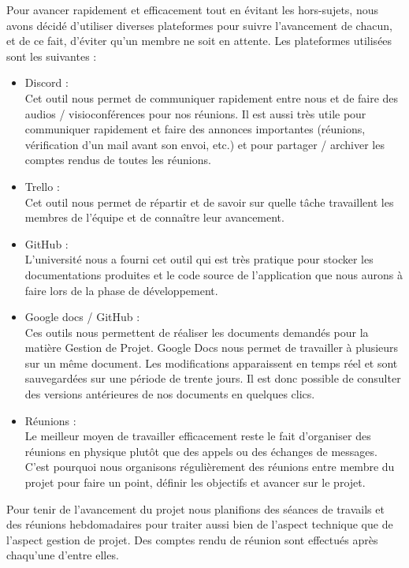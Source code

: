 Pour avancer rapidement et efficacement tout en évitant les hors-sujets, nous avons
décidé d’utiliser diverses plateformes pour suivre l’avancement de chacun, et de ce fait,
d’éviter qu’un membre ne soit en attente. Les plateformes utilisées sont les suivantes :\newline

\begin{itemize}
	\item Discord :\\
	Cet outil nous permet de communiquer rapidement entre nous et
    de faire des audios / visioconférences pour nos réunions. Il est aussi très utile
    pour communiquer rapidement et faire des annonces importantes (réunions,
    vérification d’un mail avant son envoi, etc.) et pour partager / archiver les
    comptes rendus de toutes les réunions.\\
	
    \item Trello :\\
	Cet outil nous permet de répartir et de savoir sur quelle tâche
    travaillent les membres de l’équipe et de connaître leur avancement.\\
	
    \item GitHub :\\
	L’université nous a fourni cet outil qui est très pratique pour stocker
    les documentations produites et le code source de l’application que nous
    aurons à faire lors de la phase de développement.\\
	
    \item Google docs / GitHub :\\
	Ces outils nous permettent de réaliser les documents demandés
    pour la matière Gestion de Projet. Google Docs nous permet de travailler à
    plusieurs sur un même document. Les modifications apparaissent en temps
    réel et sont sauvegardées sur une période de trente jours. Il est donc possible
    de consulter des versions antérieures de nos documents en quelques clics.\\
	
    \item Réunions :\\
	Le meilleur moyen de travailler efficacement reste le fait d'organiser des réunions en physique 
	plutôt que des appels ou des échanges de messages. C'est pourquoi nous organisons régulièrement
    des réunions entre membre du projet pour faire un point, définir les objectifs et avancer sur
    le projet. \newline
\end{itemize}

Pour tenir de l'avancement du projet nous planifions des séances de travails et des réunions
hebdomadaires pour traiter aussi bien de l'aspect technique que de l'aspect gestion de projet.
Des comptes rendu de réunion sont effectués après chaqu'une d'entre elles.
